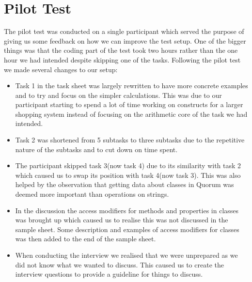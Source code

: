 \section{Pilot Test}
The pilot test was conducted on a single participant which served the purpose of giving us some feedback on how we can improve the test setup.
One of the bigger things was that the coding part of the test took two hours rather than the one hour we had intended despite skipping one of the tasks.
Following the pilot test we made several changes to our setup:
\begin{itemize}
\item Task 1 in the task sheet was largely rewritten to have more concrete examples and to try and focus on the simpler calculations.
This was due to our participant starting to spend a lot of time working on constructs for a larger shopping system instead of focusing on the arithmetic core of the task we had intended.
\item Task 2 was shortened from 5 subtasks to three subtasks due to the repetitive nature of the subtasks and to cut down on time spent.
\item The participant skipped task 3(now task 4) due to its similarity with task 2 which caused us to swap its position with task 4(now task 3).
This was also helped by the observation that getting data about classes in Quorum was deemed more important than operations on strings.
\item In the discussion the access modifiers for methods and properties in classes was brought up which caused us to realise this was not discussed in the sample sheet.
Some description and examples of access modifiers for classes was then added to the end of the sample sheet.
\item When conducting the interview we realised that we were unprepared as we did not know what we wanted to discuss.
This caused us to create the interview questions to provide a guideline for things to discuss.
\end{itemize}